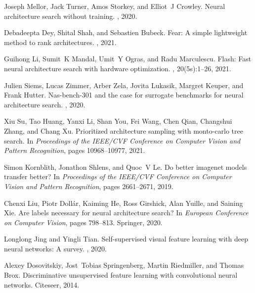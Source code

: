 \documentclass{article}
\begin{document}
\begin{thebibliography}{10}
Joseph Mellor, Jack Turner, Amos Storkey, and Elliot~J Crowley.
\newblock Neural architecture search without training.
, 2020.

Debadeepta Dey, Shital Shah, and Sebastien Bubeck.
\newblock Fear: A simple lightweight method to rank architectures.
, 2021.

Guihong Li, Sumit~K Mandal, Umit~Y Ogras, and Radu Marculescu.
\newblock Flash: Fast neural architecture search with hardware optimization.
,
  20(5s):1--26, 2021.

Julien Siems, Lucas Zimmer, Arber Zela, Jovita Lukasik, Margret Keuper, and
  Frank Hutter.
\newblock Nas-bench-301 and the case for surrogate benchmarks for neural
  architecture search.
, 2020.

Xiu Su, Tao Huang, Yanxi Li, Shan You, Fei Wang, Chen Qian, Changshui Zhang,
  and Chang Xu.
\newblock Prioritized architecture sampling with monto-carlo tree search.
\newblock In {\em Proceedings of the IEEE/CVF Conference on Computer Vision and
  Pattern Recognition}, pages 10968--10977, 2021.

Simon Kornblith, Jonathon Shlens, and Quoc~V Le.
\newblock Do better imagenet models transfer better?
\newblock In {\em Proceedings of the IEEE/CVF Conference on Computer Vision and
  Pattern Recognition}, pages 2661--2671, 2019.

Chenxi Liu, Piotr Doll{\'a}r, Kaiming He, Ross Girshick, Alan Yuille, and
  Saining Xie.
\newblock Are labels necessary for neural architecture search?
\newblock In {\em European Conference on Computer Vision}, pages 798--813.
  Springer, 2020.

Longlong Jing and Yingli Tian.
\newblock Self-supervised visual feature learning with deep neural networks: A
  survey.
,
  2020.

Alexey Dosovitskiy, Jost~Tobias Springenberg, Martin Riedmiller, and Thomas
  Brox.
\newblock Discriminative unsupervised feature learning with convolutional
  neural networks.
\newblock Citeseer, 2014.


\end{thebibliography}
\end{document}
